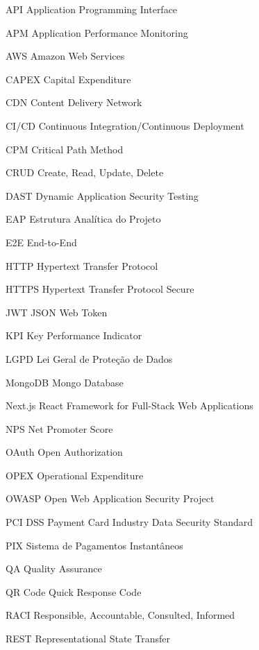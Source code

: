 

\begin{siglas}
    \item[API] Application Programming Interface
    \item[APM] Application Performance Monitoring
    \item[AWS] Amazon Web Services
    \item[CAPEX] Capital Expenditure
    \item[CDN] Content Delivery Network
    \item[CI/CD] Continuous Integration/Continuous Deployment
    \item[CPM] Critical Path Method
    \item[CRUD] Create, Read, Update, Delete
    \item[DAST] Dynamic Application Security Testing
    \item[EAP] Estrutura Analítica do Projeto
    \item[E2E] End-to-End
    \item[HTTP] Hypertext Transfer Protocol
    \item[HTTPS] Hypertext Transfer Protocol Secure
    \item[JWT] JSON Web Token
    \item[KPI] Key Performance Indicator
    \item[LGPD] Lei Geral de Proteção de Dados
    \item[MongoDB] Mongo Database
    \item[Next.js] React Framework for Full-Stack Web Applications
    \item[NPS] Net Promoter Score
    \item[OAuth] Open Authorization
    \item[OPEX] Operational Expenditure
    \item[OWASP] Open Web Application Security Project
    \item[PCI DSS] Payment Card Industry Data Security Standard
    \item[PIX] Sistema de Pagamentos Instantâneos
    \item[QA] Quality Assurance
    \item[QR Code] Quick Response Code
    \item[RACI] Responsible, Accountable, Consulted, Informed
    \item[REST] Representational State Transfer

\end{siglas}
